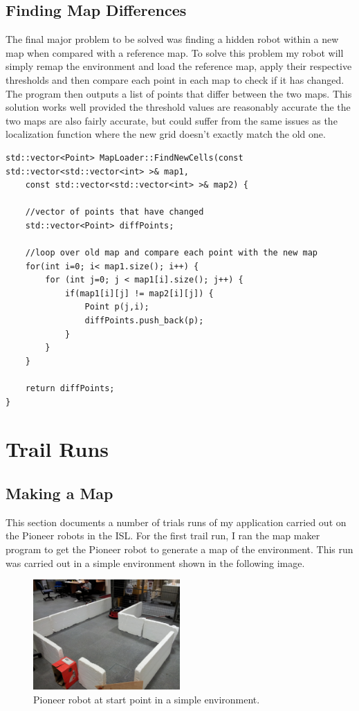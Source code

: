 \documentclass{article}
\begin{document}
\subsection{Finding Map Differences}
The final major problem to be solved was finding a hidden robot within a new map when compared with a reference map. To solve this problem my robot will simply remap the environment and load the reference map, apply their respective thresholds and then compare each point in each map to check if it has changed. The program then outputs a list of points that differ between the two maps. This solution works well provided the threshold values are reasonably accurate the the two maps are also fairly accurate, but could suffer from the same issues as the localization function where the new grid doesn't exactly match the old one.

\begin{lstlisting}[style=customcpp, caption=Function for finding differences in the map.]
std::vector<Point> MapLoader::FindNewCells(const std::vector<std::vector<int> >& map1, 
	const std::vector<std::vector<int> >& map2) {

	//vector of points that have changed
	std::vector<Point> diffPoints;

	//loop over old map and compare each point with the new map
	for(int i=0; i< map1.size(); i++) {
		for (int j=0; j < map1[i].size(); j++) {
			if(map1[i][j] != map2[i][j]) {
				Point p(j,i);
				diffPoints.push_back(p);
			}
		}
	}

	return diffPoints;
}
\end{lstlisting}

\section{Trail Runs}

\subsection{Making a Map}

This section documents a number of trials runs of my application carried out on the Pioneer robots in the ISL. For the first trail run, I ran the map maker program to get the Pioneer robot to generate a map of the environment. This run was carried out in a simple environment shown in the following image.

\begin{figure}[H]
\centering
\includegraphics[width=0.5\textwidth]{img/robot_pics/20130416_132221.jpg}
\caption{Pioneer robot at start point in a simple environment.}
\label{fig:robot-map-start}
\end{figure}
\end{document}
